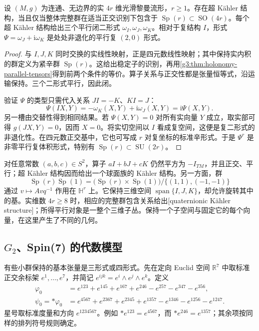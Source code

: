 \begin{proposition}\label{g3:prop:hyperkahler-holonomy}
	设 \((M,g)\) 为连通、无边界的实 \(4r\) 维光滑黎曼流形，\(r\ge1\)。存在超 Kähler 结构，当且仅当整体完整群在适当正交识别下包含于 \(\operatorname{Sp}(r)\subset\operatorname{SO}(4r)\)。每个超 Kähler 结构给出三个平行闭二形式 \(\omega_I,\omega_J,\omega_K\)。相对于复结构 \(I\)，形式 \(\Psi=\omega_J+\mathrm i\omega_K\) 是处处非退化的平行复 \((2,0)\) 形式。
\end{proposition}
\begin{proof}
	与 \(I,J,K\) 同时交换的实线性映射，正是四元数线性映射；其中保持实内积的群定义为紧辛群 \(\operatorname{Sp}(r)\)。这给出稳定子的识别，再用\cref{g3:thm:holonomy-parallel-tensors}得到前两个条件的等价。算子关系与正交性都是张量恒等式，沿运输保持。三个二形式平行，因此闭。

	验证 \(\Psi\) 的类型只需代入关系 \(JI=-K\)、\(KI=J\)：
	\[
		\Psi(IX,Y)=-\omega_K(X,Y)+\mathrm i\omega_J(X,Y)
		=\mathrm i\Psi(X,Y).
	\]
	另一槽由交替性得到相同结果。若 \(\Psi(X,Y)=0\) 对所有实向量 \(Y\) 成立，取实部可得 \(g(JX,Y)=0\)，因而 \(X=0\)。将实切空间以 \(I\) 看成复空间，这便是复二形式的非退化性。在四元数正交基中，它也可写成 \(r\) 对复坐标的标准辛形式。于是 \(\Psi^r\) 是非零平行复体积形式，特别有 \(\operatorname{Sp}(r)\subset\operatorname{SU}(2r)\)。
\end{proof}

对任意常数 \((a,b,c)\in S^2\)，算子 \(aI+bJ+cK\) 仍然平方为 \(-I_{TM}\)，并且正交、平行；超 Kähler 结构因而给出一个球面族的 Kähler 结构。另一方面，群
\[
	\operatorname{Sp}(r)\operatorname{Sp}(1)
	=\bigl(\operatorname{Sp}(r)\times\operatorname{Sp}(1)\bigr)/\{(1,1),(-1,-1)\}
\]
通过 \(v\mapsto Avq^{-1}\) 作用在 \(\mathbb H^r\) 上。它保持三维空间 \(\operatorname{span}\{I,J,K\}\)，却允许旋转其中的基。实维数 \(4r\ge8\) 时，相应的完整群包含关系给出[quaternionic Kähler structure]；所得平行对象是一整个三维子丛。保持一个子空间与固定它的每个向量，在这里产生了不同的几何。

\subsection{\texorpdfstring{\(G_2\)、Spin(7) 的代数模型}{G₂、Spin(7) 的代数模型}}
\label{g3:subsec:0505:02}

有些小群保持的基本张量是三形式或四形式。先在定向 Euclid 空间 \(\mathbb R^7\) 中取标准正交余标架 \(e^1,\ldots,e^7\)，并简记 \(e^{ijk}=e^i\wedge e^j\wedge e^k\)。定义
\begin{align}
	\varphi_0&=e^{123}+e^{145}+e^{167}+e^{246}-e^{257}-e^{347}-e^{356},\label{g3:eq:standard-g2-three-form}\\
	\psi_0=*\varphi_0&=e^{4567}+e^{2367}+e^{2345}+e^{1357}-e^{1346}-e^{1256}-e^{1247}.\label{g3:eq:standard-g2-four-form}
\end{align}
星号取标准度量和方向 \(e^{1234567}\)。例如 \(*e^{123}=e^{4567}\)，而 \(*e^{246}=e^{1357}\)；其余项按同样的排列符号规则确定。

